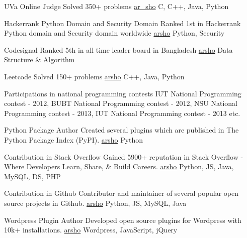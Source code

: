 \documentclass[10pt,a4paper]{altacv}
\begin{document}
\medskip

\medskip

\cvprogramming
{UVa Online Judge}
{Solved 350+ problems}
{\href{https://uhunt.onlinejudge.org/id/141799}{ar\_sho}}
{C, C++, Java, Python}
\divider

\cvprogramming
{Hackerrank Python Domain and Security Domain}
{Ranked 1st in Hackerrank Python domain and Security domain worldwide}
{\href{https://www.hackerrank.com/leaderboard?filter=arsho&filter_on=hacker&page=1&track=python&type=practice}{arsho}}
{Python, Security}
\divider

\cvprogramming
{Codesignal}
{Ranked 5th in all time leader board in Bangladesh}
{\href{https://app.codesignal.com/leaderboard/?type=individual&period=total&country=BD}{arsho}}
{Data Structure \& Algorithm}
\divider

\cvprogramming
{Leetcode}
{Solved 150+ problems}
{\href{https://leetcode.com/arsho/}{arsho}}
{C++, Java, Python}
\divider

\cvonsitecontest
{Participations in national programming contests}
{IUT National Programming
contest - 2012, BUBT National Programming
contest - 2012, NSU National Programming
contest - 2013, IUT National Programming
contest - 2013 etc.}

\medskip

\cvprogramming
{Python Package Author}
{Created several plugins which are published in The Python Package Index (PyPI).}
{\href{https://pypi.org/user/arsho/}{arsho}}
{Python}
\divider

\cvprogramming
{Contribution in Stack Overflow}
{Gained 5900+ reputation in Stack Overflow - Where Developers Learn, Share, \& Build Careers.}
{\href{https://stackoverflow.com/users/3129414/arsho}{arsho}}
{Python, JS, Java, MySQL, DS, PHP}
\divider

\cvprogramming
{Contribution in Github}
{Contributor and maintainer of several popular open source projects in Github.}
{\href{https://github.com/arsho/}{arsho}}
{Python, JS, MySQL, Java}

\divider

\cvprogramming
{Wordpress Plugin Author}
{Developed open source plugins for Wordpress with 10k+ installations.}
{\href{https://profiles.wordpress.org/arsho/}{arsho}}
{Wordpress, JavaScript, jQuery}
\end{document}
